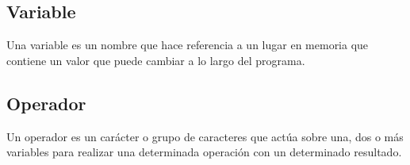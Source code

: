 \subsection{Variable}
Una variable es un nombre que hace referencia a un lugar en memoria que contiene un valor que puede cambiar a lo largo del programa.

\subsection{Operador}
Un operador es un carácter o grupo de caracteres que actúa sobre una, dos o más variables
para realizar una determinada operación con un determinado resultado.